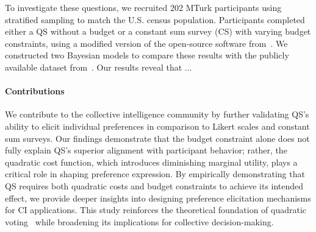
To investigate these questions, we recruited 202 MTurk participants using stratified sampling to match the U.S. census population. Participants completed either a QS without a budget or a constant sum survey (CS) with varying budget constraints, using a modified version of the open-source software from~\citet{chengCanShowWhat2021}. We constructed two Bayesian models to compare these results with the publicly available dataset from~\citet{illinoisdatabankIDB-1928463}. Our results reveal that ...


\paragraph{Contributions}
We contribute to the collective intelligence community by further validating QS's ability to elicit individual preferences in comparison to Likert scales and constant sum surveys. Our findings demonstrate that the budget constraint alone does not fully explain QS's superior alignment with participant behavior; rather, the quadratic cost function, which introduces diminishing marginal utility, plays a critical role in shaping preference expression. By empirically demonstrating that QS requires both quadratic costs and budget constraints to achieve its intended effect, we provide deeper insights into designing preference elicitation mechanisms for CI applications. This study reinforces the theoretical foundation of quadratic voting~\cite{lalley2016quadratic} while broadening its implications for collective decision-making.

